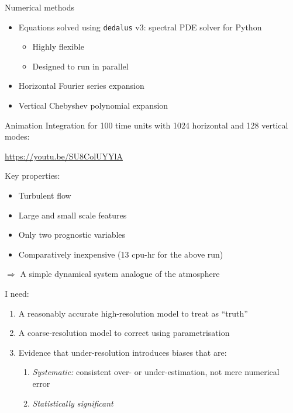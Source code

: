 \documentclass[12pt, aspectratio=169]{beamer}
\begin{document}
\begin{frame}{Numerical methods}
\begin{itemize}
    \item Equations solved using \texttt{dedalus} v3: spectral PDE solver
        for Python
    \begin{itemize}
        \item Highly flexible
        \item Designed to run in parallel
    \end{itemize}
    \item Horizontal Fourier series expansion
    \item Vertical Chebyshev polynomial expansion
\end{itemize}
\end{frame}

\begin{frame}{Animation}
Integration for 100 time units with 1024 horizontal and 128 vertical modes:
\begin{center}
    \url{https://youtu.be/SU8ColUYYlA}
\end{center}

Key properties:
\begin{itemize}
    \item Turbulent flow
    \item Large and small scale features
    \item Only two prognostic variables
    \item Comparatively inexpensive (13 cpu-hr for the above run)
\end{itemize}

\vspace{3mm}
{\color{hilight} $\Rightarrow$ A simple dynamical system analogue of the
atmosphere}
\end{frame}

\begin{frame}{I need:}
\begin{enumerate}
    \item A reasonably accurate high-resolution model to treat as ``truth''
    \item A coarse-resolution model to correct using parametrisation
    \item Evidence that under-resolution introduces biases that are:
    \begin{enumerate}[i]
        \item \emph{Systematic:} consistent over- or under-estimation,
            not mere numerical error
        \item \emph{Statistically significant}
    \end{enumerate}
\end{enumerate}
\end{frame}
\end{document}
